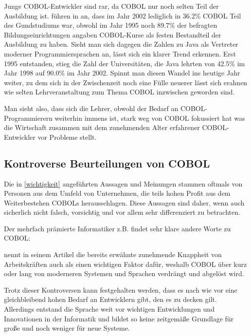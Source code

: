 Junge COBOL-Entwickler sind rar, da COBOL nur noch selten Teil der Ausbildung ist. \citeauthor{doke_cobol_2005} führen in  an, dass im Jahr 2002 lediglich in 36.2\% COBOL Teil des Gundstudiums war, obwohl im Jahr 1995 noch 89.7\% der befragten Bildungseinrichtungen angaben COBOL-Kurse als festen Bestandteil der Ausbildung zu haben. Sieht man sich dagegen die Zahlen zu Java als Vertreter moderner Programmiersprachen an, lässt sich ein klarer Trend erkennen. Erst 1995 entstanden, stieg die Zahl der  Universitäten, die Java lehrten von 42.5\% im Jahr 1998 auf 90.0\% im Jahr 2002. Spinnt man diesen Wandel ins heutige Jahr weiter, zu dem sich in der Zwischenzeit noch eine Fülle neuerer lässt sich erahnen wie selten Lehrveranstaltung zum Thema COBOL inzwischen geworden sind.

Man sieht also, dass sich die Lehrer, obwohl der Bedarf an COBOL-Programmierern weiterhin immens ist, stark weg von COBOL fokussiert hat was die Wirtschaft zusammen mit dem zunehmenden Alter erfahrener COBOL-Entwickler vor Probleme stellt.

\subsection*{Kontroverse Beurteilungen von COBOL}
Die in \autoref{wichtigkeit} angeführten Aussagen und Meinungen stammen oftmals von Personen aus dem Umfeld von Unternehmen, die teils hohen Profit aus dem Weiterbestehen COBOLs herausschlagen. Diese Aussagen sind daher, wenn auch sicherlich nicht falsch, vorsichtig und vor allem sehr differenziert zu betrachten.

Der mehrfach prämierte Informatiker \citeauthor{edsger_wybe_dijkstra_how_1975} z.B. findet sehr klare andere Worte zu COBOL:  \cite{edsger_wybe_dijkstra_how_1975}

\citeauthor{florian_hamann_banken_2017} nennt in seinem Artikel  die bereits erwähnte zunehmende Knappheit von Arbeitskräften auch als einen wichtigen Faktor dafür, weshalb COBOL über kurz oder lang von moderneren Systemen und Sprachen verdrängt und abgelöst wird.

Trotz dieser Kontroversen kann festgehalten werden, dass es nach wie vor eine gleichbleibend hohen Bedarf an Entwicklern gibt, den es zu decken gilt. Allerdings entstand die Sprache weit vor wichtigen Entwicklungen und Innovationen in der Informatik und bildet so keine zeitgemäße Grundlage für große und noch weniger für neue Systeme.

